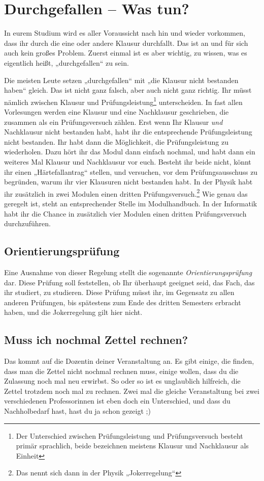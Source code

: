 \newpage\section{Durchgefallen -- Was tun?}

In eurem Studium wird es aller Voraussicht nach hin und wieder vorkommen, dass ihr durch die eine oder andere Klausur durchfallt. Das ist an und für sich auch kein großes Problem. Zuerst einmal ist es aber wichtig, zu wissen, was es eigentlich heißt, „durchgefallen“ zu sein.

Die meisten Leute setzen „durchgefallen“ mit „die Klausur nicht bestanden haben“ gleich. Das ist nicht ganz falsch, aber auch nicht ganz richtig. Ihr müsst nämlich zwischen Klausur und Prüfungsleistung\footnote{ Der Unterschied zwischen Prüfungsleistung und Prüfungsversuch besteht primär sprachlich, beide bezeichnen meistens Klausur und Nachklausur als Einheit} unterscheiden. In fast allen Vorlesungen werden eine Klausur und eine Nachklausur geschrieben, die zusammen als ein Prüfungsversuch zählen. Erst wenn Ihr Klausur \emph{und} Nachklausur nicht bestanden habt, habt ihr die entsprechende Prüfungsleistung nicht bestanden. Ihr habt dann die Möglichkeit, die Prüfungsleistung zu wiederholen. Dazu hört ihr das Modul dann einfach nochmal, und habt dann ein weiteres Mal Klausur und Nachklausur vor euch. Besteht ihr beide nicht, könnt ihr einen „Härtefallantrag“ stellen, und versuchen, vor dem Prüfungsausschuss zu begründen, warum ihr vier Klausuren nicht bestanden habt. In der Physik habt ihr zusätzlich in zwei Modulen einen dritten Prüfungsversuch.\footnote{Das nennt sich dann in der Physik „Jokerregelung“} Wie genau das geregelt ist, steht an entsprechender Stelle im Modulhandbuch. In der Informatik habt ihr die Chance in zusätzlich vier Modulen einen dritten Prüfungsversuch durchzuführen.

\subsection{Orientierungsprüfung}
Eine Ausnahme von dieser Regelung stellt die sogenannte \emph{Orientierungsprüfung} dar. Diese Prüfung soll feststellen, ob Ihr überhaupt geeignet seid, das Fach, das ihr studiert, zu studieren. Diese Prüfung müsst ihr, im Gegensatz zu allen anderen Prüfungen, bis spätestens zum Ende des dritten Semesters erbracht haben, und die Jokerregelung gilt hier nicht.

\subsection{Muss ich nochmal Zettel rechnen?}
Das kommt auf die Dozentin deiner Veranstaltung an. Es gibt einige, die finden, dass man die Zettel nicht nochmal rechnen muss, einige wollen, dass du die Zulassung noch mal neu erwirbst. So oder so ist es unglaublich hilfreich, die Zettel trotzdem noch mal zu rechnen. Zwei mal die gleiche Veranstaltung bei zwei verschiedenen Professorinnen ist eben doch ein Unterschied, und dass du Nachholbedarf hast, hast du ja schon gezeigt ;)
